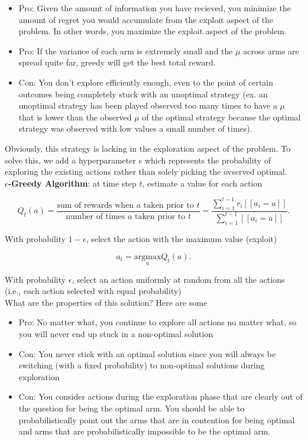 \documentclass[12pt]{article}
\begin{document}
\begin{itemize}
	\item Pro: Given the amount of information you have recieved, you minimize the amount of regret you would accumulate from the exploit aspect of the problem. In other words, you maximize the exploit aspect of the problem.

	\item Pro: If the variance of each arm is extremely small and the $\mu$ across arms are spread quite far, greedy will get the best total reward.

	\item Con: You don't explore efficiently enough, even to the point of certain outcomes being completely stuck with an unoptimal strategy (ex. an unoptimal strategy has been played observed too many times to have a $\mu$ that is lower than the observed $\mu$ of the optimal strategy because the optimal strategy was observed with low values a small number of times).

\end{itemize}

Obviously, this strategy is lacking in the exploration aspect of the problem. To solve this, we add a hyperparameter $\epsilon$ which represents the probability of exploring the existing actions rather than solely picking the ovserved optimal.\\

\textbf{$\epsilon$-Greedy Algorithm}: at time step $t$, estimate a value for each action

\[ Q_t(a) = \frac {\text{sum of rewards when $a$ taken prior to $t$}} {\text{number of times $a$ taken prior to $t$}} = \frac {\sum_{i=1}^{t-1}r_i [[a_i = a]]} {\sum_{i=1}^{t-1}[[a_i = a]]}. \]

With probability $1-\epsilon$, select the action with the maximum value (exploit)

\[ a_t = \underset{a}{\text{argmax}} Q_t(a). \]

With probability $\epsilon$, select an action uniformly at random from all the actions (i.e., each action selected with equal probability)\\

What are the properties of this solution? Here are some

\begin{itemize}
	\item Pro: No matter what, you continue to explore all actions no matter what, so you will never end up stuck in a non-optimal solution

	\item Con: You never stick with an optimal solution since you will always be switching (with a fixed probability) to non-optimal solutions during exploration

	\item Con: You consider actions during the exploration phase that are clearly out of the question for being the optimal arm. You should be able to probabilistically point out the arms that are in contention for being optimal and arms that are probabilistically impossible to be the optimal arm.

\end{itemize}
\end{document}
